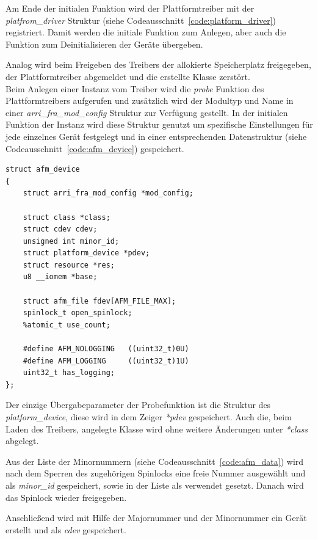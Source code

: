 Am Ende der initialen Funktion wird der Plattformtreiber mit der \textit{platfrom\_driver} Struktur (siehe Codeausschnitt~\ref{code:platform_driver}) registriert. Damit werden die initiale Funktion zum Anlegen, aber auch die Funktion zum Deinitialisieren der Geräte übergeben.


Analog wird beim Freigeben des Treibers der allokierte Speicherplatz freigegeben, der Plattformtreiber abgemeldet und die erstellte Klasse zerstört.\\


Beim Anlegen einer Instanz vom Treiber wird die \textit{probe} Funktion des Plattformtreibers aufgerufen und zusätzlich wird der Modultyp und Name in einer \textit{arri\_fra\_mod\_config} Struktur zur Verfügung gestellt. In der initialen Funktion der Instanz wird diese Struktur genutzt um spezifische Einstellungen für jede einzelnes Gerät festgelegt und in einer entsprechenden Datenstruktur (siehe Codeausschnitt~\ref{code:afm_device}) gespeichert. 

\begin{lstfloat}
\begin{lstlisting}
struct afm_device 
{
	struct arri_fra_mod_config *mod_config;
	
	struct class *class;
	struct cdev cdev;
	unsigned int minor_id;
	struct platform_device *pdev;
	struct resource *res;
	u8 __iomem *base;
	
	struct afm_file fdev[AFM_FILE_MAX];
	spinlock_t open_spinlock;
	%atomic_t use_count;
	
	#define AFM_NOLOGGING   ((uint32_t)0U)
	#define AFM_LOGGING     ((uint32_t)1U)
	uint32_t has_logging;
};
\end{lstlisting}
\end{lstfloat}

Der einzige Übergabeparameter der Probefunktion ist die Struktur des \textit{platform\_device}, diese wird in dem Zeiger \textit{*pdev} gespeichert. Auch die, beim Laden des Treibers, angelegte Klasse wird ohne weitere Änderungen unter \textit{*class} abgelegt. 

Aus der Liste der Minornummern (siehe Codeausschnitt~\ref{code:afm_data}) wird nach dem Sperren des zugehörigen Spinlocks eine freie Nummer ausgewählt und als \textit{minor\_id} gespeichert, sowie in der Liste als verwendet gesetzt. Danach wird das Spinlock wieder freigegeben.

Anschließend wird mit Hilfe der Majornummer und der Minornummer ein Gerät erstellt und als \textit{cdev} gespeichert. 

